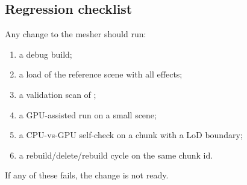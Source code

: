 \subsection{Regression checklist}

Any change to the mesher should run:
\begin{enumerate}
\item a debug build;
\item a load of the reference scene with all effects;
\item a validation scan of ;
\item a GPU-assisted run on a small scene;
\item a CPU-vs-GPU self-check on a chunk with a LoD boundary;
\item a rebuild/delete/rebuild cycle on the same chunk id.
\end{enumerate}
If any of these fails, the change is not ready.
